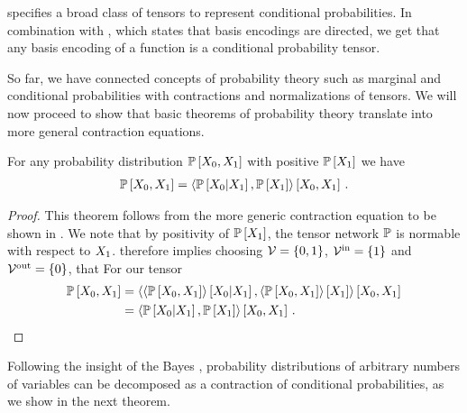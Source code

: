 %
 specifies a broad class of tensors to represent conditional probabilities.
In combination with , which states that basis encodings are directed, we get that any basis encoding of a function is a conditional probability tensor.



So far, we have connected concepts of probability theory such as marginal and conditional probabilities with contractions and normalizations of tensors.
We will now proceed to show that basic theorems of probability theory translate into more general contraction equations.

\begin{theorem}
    \label{the:bayes}
    For any probability distribution $\mathbb{P}\left[X_{0}, X_{1}\right]$ with positive $\mathbb{P}\left[X_{1}\right]$ we have
    \begin{align*}
        \mathbb{P}\left[X_{0},X_{1}\right]
        = \left\langle \mathbb{P}\left[X_{0}|X_{1}\right],\mathbb{P}\left[X_{1}\right]\right\rangle \left[ X_{0},X_{1} \right] \, .
    \end{align*}
\end{theorem}
\begin{proof}
    This theorem follows from the more generic contraction equation  to be shown in .
    We note that by positivity of $\mathbb{P}\left[X_{1}\right]$, the tensor network $\mathbb{P}$ is normable with respect to $X_{1}$.
     therefore implies choosing $\mathcal{V}=\{0,1\}$, $\mathcal{V}^{\mathrm{in}}=\{1\}$ and $\mathcal{V}^{\mathrm{out}}=\{0\}$, that
    For our tensor
    \begin{align*}
        \mathbb{P}\left[X_{0},X_{1}\right]
        &=\left\langle 
            \left\langle \mathbb{P}\left[X_{0},X_{1}\right]\right\rangle \left[ X_{0} | X_{1} \right],
            \left\langle \mathbb{P}\left[X_{0},X_{1}\right]\right\rangle \left[ X_{1} \right]
        \right\rangle \left[ X_{0},X_{1} \right] \\
        &=\left\langle \mathbb{P}\left[X_{0}|X_{1}\right],\mathbb{P}\left[X_{1}\right]\right\rangle \left[ X_{0},X_{1} \right] \, .
    \end{align*}
\end{proof}

Following the insight of the Bayes , probability distributions of arbitrary numbers of variables can be decomposed as a contraction of conditional probabilities, as we show in the next theorem.

